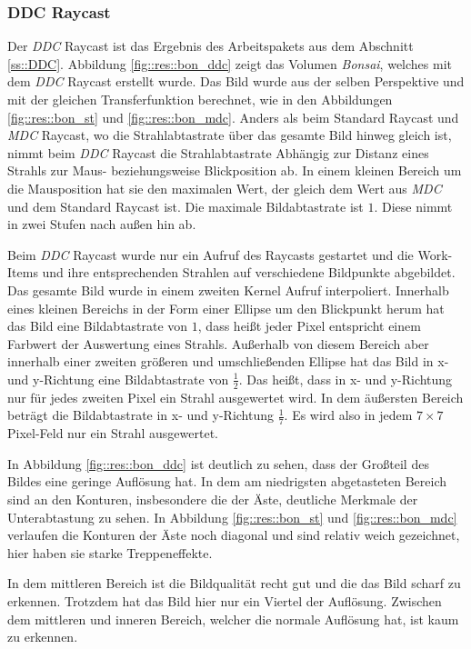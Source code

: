 \subsubsection{DDC Raycast}\label{ss::res::ddc}
Der \emph{DDC} Raycast ist das Ergebnis des Arbeitspakets aus dem Abschnitt \ref{ss::DDC}.
Abbildung \ref{fig::res::bon_ddc} zeigt das Volumen \emph{Bonsai}, welches mit dem \emph{DDC} Raycast erstellt wurde.
Das Bild wurde aus der selben Perspektive und mit der gleichen Transferfunktion berechnet, wie in den Abbildungen \ref{fig::res::bon_st} und \ref{fig::res::bon_mdc}.
Anders als beim Standard Raycast und \emph{MDC} Raycast, wo die Strahlabtastrate über das gesamte Bild hinweg gleich ist, nimmt beim \emph{DDC} Raycast die Strahlabtastrate Abhängig zur Distanz eines Strahls zur Maus- beziehungsweise Blickposition ab.
In einem kleinen Bereich um die Mausposition hat sie den maximalen Wert, der gleich dem Wert aus \emph{MDC} und dem Standard Raycast ist.
Die maximale Bildabtastrate ist $1$.
Diese nimmt in zwei Stufen nach außen hin ab.

Beim \emph{DDC} Raycast wurde nur ein Aufruf des Raycasts gestartet und die Work-Items und ihre entsprechenden Strahlen auf verschiedene Bildpunkte abgebildet.
Das gesamte Bild wurde in einem zweiten Kernel Aufruf interpoliert.
Innerhalb eines kleinen Bereichs in der Form einer Ellipse um den Blickpunkt herum hat das Bild eine Bildabtastrate von $1$, dass heißt jeder Pixel entspricht einem Farbwert der Auswertung eines Strahls.
Außerhalb von diesem Bereich aber innerhalb einer zweiten größeren und umschließenden Ellipse hat das Bild in x- und y-Richtung eine Bildabtastrate von $\frac{1}{2}$.
Das heißt, dass in x- und y-Richtung nur für jedes zweiten Pixel ein Strahl ausgewertet wird.
In dem äußersten Bereich beträgt die Bildabtastrate in x- und y-Richtung $\frac{1}{7}$.
Es wird also in jedem $7\times7$\,Pixel-Feld nur ein Strahl ausgewertet.

In Abbildung \ref{fig::res::bon_ddc} ist deutlich zu sehen, dass der Großteil des Bildes eine geringe Auflösung hat.
In dem am niedrigsten abgetasteten Bereich sind an den Konturen, insbesondere die der Äste, deutliche Merkmale der Unterabtastung zu sehen.
In Abbildung \ref{fig::res::bon_st} und \ref{fig::res::bon_mdc} verlaufen die Konturen der Äste noch diagonal und sind relativ weich gezeichnet, hier haben sie starke Treppeneffekte.

In dem mittleren Bereich ist die Bildqualität recht gut und die das Bild scharf zu erkennen.
Trotzdem hat das Bild hier nur ein Viertel der Auflösung.
Zwischen dem mittleren und inneren Bereich, welcher die normale Auflösung hat, ist kaum zu erkennen.

